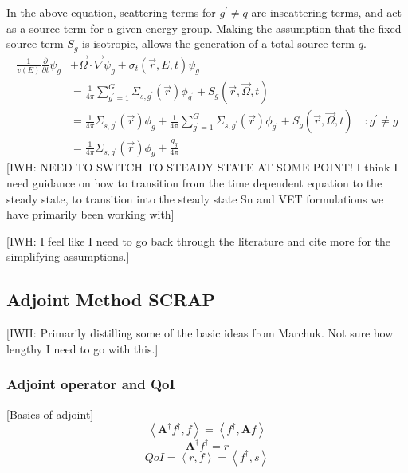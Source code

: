 \documentclass{article}
\newcommand{\vr}{\vec{r}}
\newcommand{\vO}{\vec{\Omega}}
\newcommand{\bra}{\left\langle}
\newcommand{\ket}{\right\rangle}
\newcommand{\vgrad}{\vec{\nabla}}
\newcommand{\sigt}{\sigma_t}
\newcommand{\qoi}{QoI}
\begin{document}
In the above equation, scattering terms for $g^\prime \neq q$ are inscattering terms, and act as a source term for a given energy group. Making the assumption that the fixed source term $S_g$ is isotropic, allows the generation of a total source term $q$.
\begin{equation}
\begin{split}
\frac{1}{v(E)} \frac{\partial}{\partial t}\psi_g &+ \vO \cdot \vgrad \psi_g + \sigt(\vr,E,t) \psi_g \\
&= \frac{1}{4 \pi} \sum_{g^\prime=1}^G  \Sigma_{s,g^\prime}(\vr) \phi_{g^\prime} + S_g(\vr,\vO,t) \\
&= \frac{1}{4 \pi} \Sigma_{s,g^\prime}(\vr) \phi_{g}
+ \frac{1}{4 \pi} \sum_{g^\prime=1}^G  \Sigma_{s,g^\prime}(\vr) \phi_{g^\prime} + S_g(\vr,\vO,t)  \quad :g^\prime \neq g\\
&= \frac{1}{4 \pi} \Sigma_{s,g^\prime}(\vr) \phi_{g}
+ \frac{q_g}{4 \pi}\
\end{split}
\end{equation}
{\color{red}[IWH: NEED TO SWITCH TO STEADY STATE AT SOME POINT! I think I need guidance on how to transition from the time dependent equation to the steady state, to transition into the steady state Sn and VET formulations we have primarily been working with]}

{\color{red}[IWH: I feel like I need to go back through the literature and cite more for the simplifying assumptions.]}


\subsection{Adjoint Method SCRAP}
{\color{red}[IWH: Primarily distilling some of the basic ideas from Marchuk. Not sure how lengthy I need to go with this.]}
\subsubsection{Adjoint operator and QoI}
[Basics of adjoint]
\begin{equation}
\bra \mathbf{A^\dag} f^\dag, f \ket = \bra f^\dag, \mathbf{A} f \ket 
\end{equation}
\begin{equation}
\mathbf{A^\dag} f^\dag = r
\end{equation}
\begin{equation}
\qoi = \bra r , f \ket = \bra f^\dag, s \ket 
\end{equation}
\end{document}
